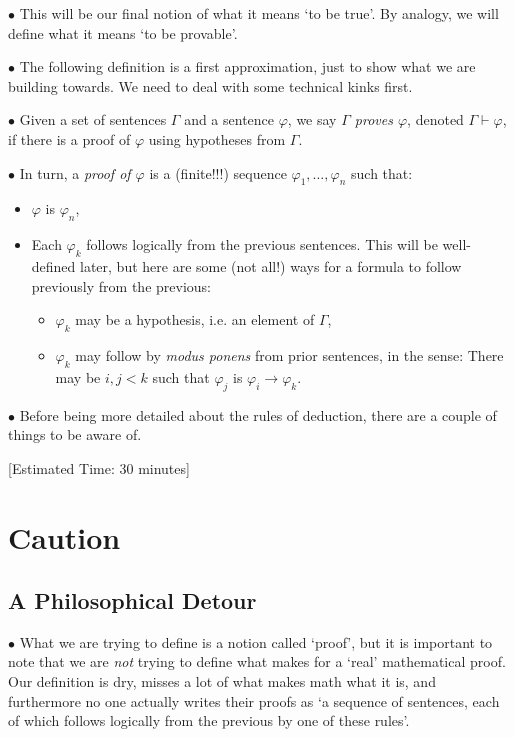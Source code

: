 \documentclass{article}
\newcommand\point[1]{\noindent \hspace{\labelsep} $\bullet$ #1 \smallskip}
\newcommand\timestamp[1]{\noindent \hspace{\labelsep} [Estimated Time: #1] \smallskip}
\begin{document}
\point{This will be our final notion of what it means `to be true'. By analogy, we will define what it means `to be provable'.}

\point{The following definition is a first approximation, just to show what we are building towards. We need to deal with some technical kinks first.}

\point{Given a set of sentences $\Gamma$ and a sentence $\varphi$, we say \emph{$\Gamma$ proves $\varphi$}, denoted $\Gamma \vdash \varphi$, if there is a proof of $\varphi$ using hypotheses from $\Gamma$.}

\point{In turn, a \emph{proof of $\varphi$} is a (finite!!!) sequence $\varphi_1, \dots, \varphi_n$ such that:
\begin{itemize}
\item $\varphi$ is $\varphi_n$,
\item Each $\varphi_k$ follows logically from the previous sentences. This will be well-defined later, but here are some (not all!) ways for a formula to follow previously from the previous:
\begin{itemize}
\item $\varphi_k$ may be a hypothesis, i.e. an element of $\Gamma$,
\item $\varphi_k$ may follow by \emph{modus ponens} from prior sentences, in the sense: There may be $i, j < k$ such that $\varphi_j$ is $\varphi_i \rightarrow \varphi_k$.
\end{itemize}
\end{itemize}}

\point{Before being more detailed about the rules of deduction, there are a couple of things to be aware of.}

\timestamp{30 minutes}

\section{Caution}

\subsection{A Philosophical Detour}

\point{What we are trying to define is a notion called `proof', but it is important to note that we are \emph{not} trying to define what makes for a `real' mathematical proof. Our definition is dry, misses a lot of what makes math what it is, and furthermore no one actually writes their proofs as `a sequence of sentences, each of which follows logically from the previous by one of these rules'.}
\end{document}
